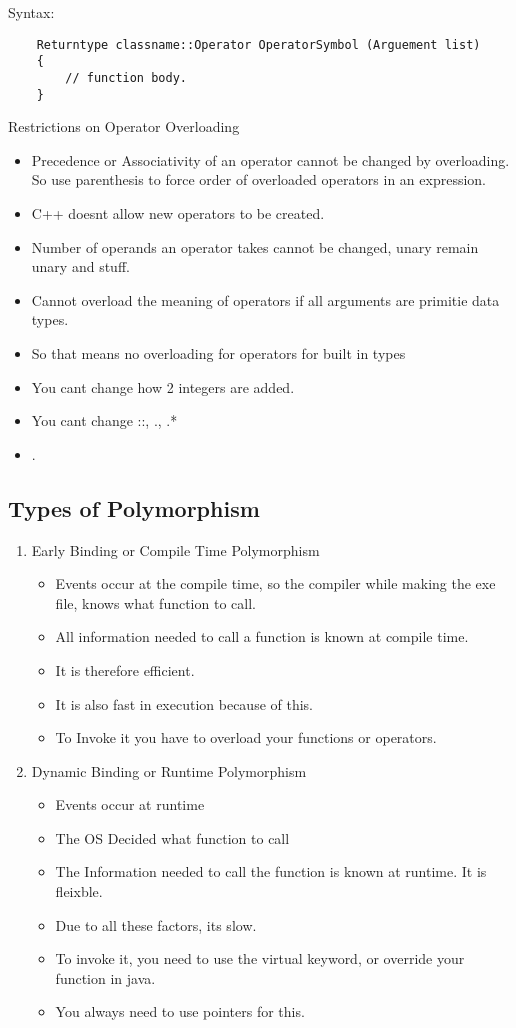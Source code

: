 \documentclass[11pt]{article}
\begin{document}
Syntax: 
\begin{verbatim}
	Returntype classname::Operator OperatorSymbol (Arguement list)
	{
		// function body. 
	}
\end{verbatim}

Restrictions on Operator Overloading

\begin{itemize}
	\item Precedence or Associativity of an operator cannot be changed by overloading. So use parenthesis to force order of overloaded operators in an expression. 
	\item C++ doesnt allow new operators to be created. 
	\item Number of operands an operator takes cannot be changed, unary remain unary and stuff. 
	\item Cannot overload the meaning of operators if all arguments are primitie data types. 
	\item So that means no overloading for operators for built in types
	\item You cant change how 2 integers are added. 
	\item You cant change ::, ., .*
	\item .
\end{itemize}

\subsection{Types of Polymorphism}

\begin{enumerate}
	\item Early Binding or Compile Time Polymorphism
	\begin{itemize}
		\item Events occur at the compile time, so the compiler while making the exe file, knows what function to call. 
		\item All information needed to call a function is known at compile time. 
		\item It is therefore efficient. 
		\item It is also fast in execution because of this.
		\item To Invoke it you have to overload your functions or operators. 
	\end{itemize}
	\item Dynamic Binding or Runtime Polymorphism
	\begin{itemize}
		\item Events occur at runtime
		\item The OS Decided what function to call
		\item The Information needed to call the function is known at runtime. It is fleixble. 
		\item Due to all these factors, its slow. 
		\item To invoke it, you need to use the virtual keyword, or override your function in java. 
		\item You always need to use pointers for this. 
	\end{itemize}
\end{enumerate}
\end{document}
